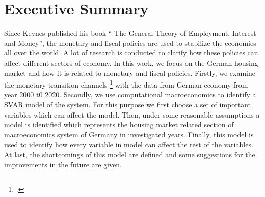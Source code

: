 \section*{Executive Summary}

Since Keynes published his book \enquote{ The General Theory of Employment, Interest and Money}, the monetary and fiscal policies are used to stabilize the economies all over the world. A lot of research is conducted to clarify how these policies can affect different sectors of economy. In this work, we focus on the German housing market and  how it is related to monetary and fiscal policies. Firstly, we examine the monetary transition channels \footcite[See.][]{Mishkin1996} with the data from German economy from year 2000 t0 2020. Secondly, we use computational macroeconomics to identify a \ac{SVAR} model of the system. For this purpose we first choose a set of important variables which can affect the model. Then, under some reasonable assumptions a model is identified which represents the housing market related section of macroeconomics system of Germany in investigated years. Finally, this model is used to identify how every variable in model can affect the rest of the variables. At last, the shortcomings of this model are defined and some suggestions for the improvements in the future are given.